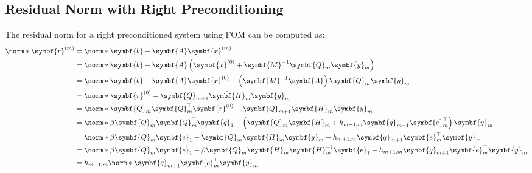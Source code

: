 \documentclass{article}
\begin{document}
\begin{appendix}
    \subsection{Residual Norm with Right Preconditioning}\label{app:res-right-precond}
    The residual norm for a right preconditioned system using FOM can be
    computed as:
    \begin{align*}
        \norm*{\symbf{r}^{\left( m \right)}} & = \norm*{\symbf{b} - \symbf{A} \symbf{x}^{\left( m \right)}}                                                                                                  \\
                                             & = \norm*{\symbf{b} - \symbf{A} \left( \symbf{x}^{\left( 0 \right)} + \symbf{M}^{-1} \symbf{Q}_m \symbf{y}_m \right)}                                          \\
                                             & = \norm*{\symbf{b} - \symbf{A} \symbf{x}^{\left( 0 \right)} - \left( \symbf{M}^{-1} \symbf{A} \right) \symbf{Q}_m \symbf{y}_m}                                \\
                                             & = \norm*{\symbf{r}^{\left( 0 \right)} - \symbf{Q}_{m+1} \bar{\symbf{H}}_m \symbf{y}_m}                                                                        \\
                                             & = \norm*{\symbf{Q}_m \symbf{Q}_m^\top \symbf{r}^{\left( 0 \right)} - \symbf{Q}_{m+1} \bar{\symbf{H}}_m \symbf{y}_m}                                           \\
                                             & = \norm*{\beta \symbf{Q}_m \symbf{Q}_m^\top \symbf{q}_1 - \left( \symbf{Q}_m \symbf{H}_m + h_{m+1,m} \symbf{q}_{m+1} \symbf{e}_m^\top \right) \symbf{y}_m}    \\
                                             & = \norm*{\beta \symbf{Q}_m \symbf{e}_1 - \symbf{Q}_m \symbf{H}_m \symbf{y}_m - h_{m+1,m} \symbf{q}_{m+1} \symbf{e}_m^\top \symbf{y}_m}                        \\
                                             & = \norm*{\beta \symbf{Q}_m \symbf{e}_1 - \beta \symbf{Q}_m \symbf{H}_m \symbf{H}_m^{-1} \symbf{e}_1 - h_{m+1,m} \symbf{q}_{m+1} \symbf{e}_m^\top \symbf{y}_m} \\
                                             & = h_{m+1,m} \norm*{\symbf{q}_{m+1} \symbf{e}_m^\top \symbf{y}_m}                                                                                              \\

\end{align*}
\end{appendix}
\end{document}
